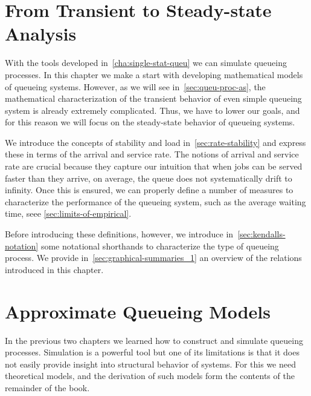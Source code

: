 





\chapter{From Transient to Steady-state Analysis}
\label{cha:from-trans-steady}


With the tools developed in~\cref{cha:single-stat-queu} we can simulate queueing processes.
In this chapter we make a start with developing mathematical models of queueing systems.
However, as we will see in~\cref{sec:queu-proc-as}, the mathematical characterization of the transient behavior of even simple queueing system is already extremely complicated.
Thus, we have to lower our goals, and for this reason we will focus on the steady-state behavior of queueing systems.


We introduce the concepts of stability and load in~\cref{sec:rate-stability} and express these in terms of the arrival and service rate.
The notions of arrival and service rate are crucial because they capture our intuition that when jobs can be served faster than they arrive, on average, the queue does not systematically drift to infinity. 
Once this is ensured, we can properly define a number of measures to characterize the performance of the queueing system, such as the average waiting time, seee \cref{sec:limits-of-empirical}.


Before introducing these definitions, however, we introduce in~\cref{sec:kendalls-notation} some notational shorthands to characterize the type of queueing process.
We provide in~\cref{sec:graphical-summaries_1} an overview of the relations  introduced in this chapter.


 





\chapter{Approximate Queueing Models}
\label{cha:approximate-models}


In the previous two chapters we learned how to construct and simulate queueing processes.
Simulation is a powerful tool but one of its limitations is that it does not easily provide insight into structural behavior of systems.
For this we need theoretical models, and the derivation of such models form the contents of the remainder of the book.


